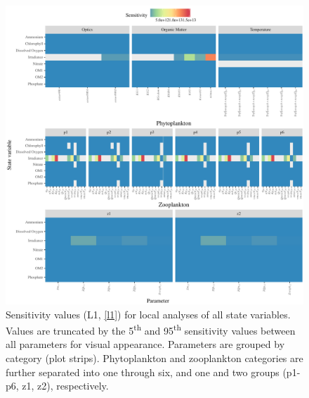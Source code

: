\documentclass[letterpaper,12pt,oneside]{article}\usepackage[]{graphicx}\usepackage[]{color}
\begin{document}
\begin{figure}[!ht]

{\centering \includegraphics[width=\textwidth]{figs/sensalltile-1} 

}

\caption{Sensitivity values (L1, \cref{l1}) for local analyses of all state variables.  Values are truncated by the 5\textsuperscript{th} and 95\textsuperscript{th} sensitivity values between all parameters for visual appearance. Parameters are grouped by category (plot strips).  Phytoplankton and zooplankton categories are further separated into one through six, and one and two groups (p1-p6, z1, z2), respectively.}\label{fig:sensalltile}
\end{figure}
\end{document}
